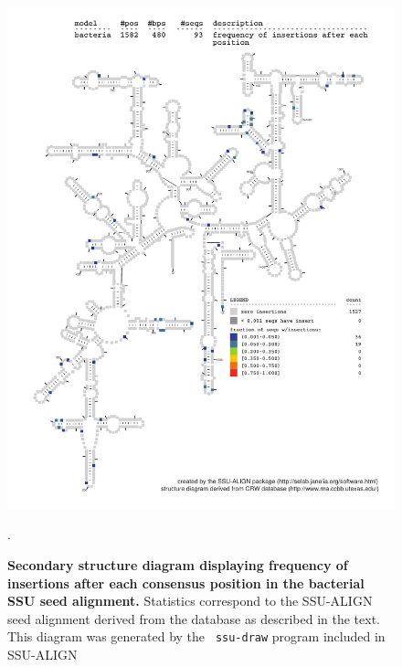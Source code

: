 \begin{figure}
\begin{center}
\includegraphics[width=5.64in]{Figures/bacteria-0p1-ifreq}
\end{center}
\caption[Secondary structure diagram displaying frequency of insertions
  after each consensus position in the bacterial SSU seed
  alignment]{\textbf{Secondary structure diagram displaying frequency
  of insertions after each consensus position in the bacterial SSU seed
  alignment.} Statistics correspond to the SSU-ALIGN seed
  alignment derived from the  database \cite{CannoneGutell02}
  as described in the text. This diagram was generated by the {\tt
  ssu-draw} program included in SSU-ALIGN}.
\label{fig:bacifreq}
\end{figure}

\newpage 

